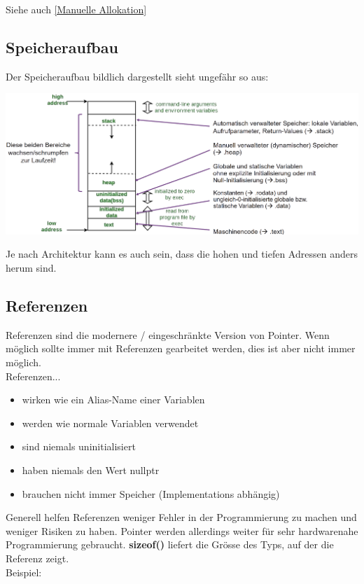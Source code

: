 Siehe auch \ref{Manuelle Allokation}

\nextcol

\subsection{Speicheraufbau}

Der Speicheraufbau bildlich dargestellt sieht ungefähr so aus:

\begin{center}
    \includegraphics[width=\columnwidth]{pictures/memorylayout.png}  
\end{center}

Je nach Architektur kann es auch sein, dass die hohen und tiefen Adressen anders herum sind.

\subsection{Referenzen}

Referenzen sind die modernere / eingeschränkte Version von Pointer. 
Wenn möglich sollte immer mit Referenzen gearbeitet werden, dies ist aber nicht immer möglich.\\

Referenzen...
\begin{itemize}[itemsep=1pt, parsep=0pt]
    \item wirken wie ein Alias-Name einer Variablen
    \item werden wie normale Variablen verwendet
    \item sind niemals uninitialisiert
    \item haben niemals den Wert nullptr
    \item brauchen nicht immer Speicher (Implementations abhängig)
\end{itemize}

Generell helfen Referenzen weniger Fehler in der Programmierung zu machen und weniger Risiken zu haben. 
Pointer werden allerdings weiter für sehr hardwarenahe Programmierung gebraucht. 
\textbf{sizeof()} liefert die Grösse des Typs, auf der die Referenz zeigt.\\
Beispiel:

